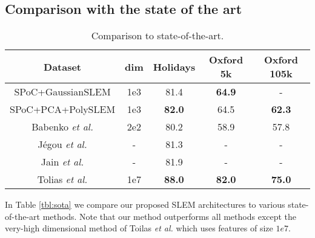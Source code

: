 \subsection{Comparison with the state of the art}
\label{sec:sota}
\begin{table}[!t]
  \centering
  \caption{Comparison to state-of-the-art.}
  \label{tbl:sota}
  \setlength{\tabcolsep}{.5em}
  \begin{tabular}{ccccc}
    \toprule
    Dataset & dim &\textbf{Holidays} & \textbf{Oxford 5k} & \textbf{Oxford 105k}\\
    \midrule
    SPoC+GaussianSLEM                           & 1e3  &  81.4           &  \textbf{64.9}  &   -  \\
    SPoC+PCA+PolySLEM                           & 1e3  &  \textbf{82.0}    &   64.5  &  \textbf{62.3} \\
    Babenko \textit{et al.} \cite{babenko15}     & 2e2  &  80.2           &   58.9  &  57.8 \\
    J\'egou \textit{et al.} \cite{sota1}         & -    &  81.3           &    -    &   -   \\
    Jain \textit{et al. } \cite{JaJeGro11}       &   -  &  81.9           &    -    &   -   \\
    \midrule
    Tolias \textit{et al.} \cite{Tolias13}      & 1e7  &  \textbf{88.0}     &  \textbf{82.0}    &  \textbf{75.0}   \\
    \bottomrule
  \end{tabular}
  \label{tab:sota}
\end{table}

In Table \ref{tbl:sota} we compare our proposed SLEM architectures to various state-of-the-art methods. Note that our method outperforms all methods except the very-high dimensional method of Toilas \textit{et al.} \cite{Tolias13} which uses features of size $1e7$.


